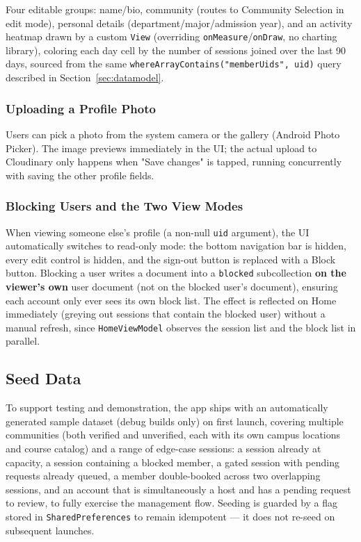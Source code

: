 Four editable groups: name/bio, community (routes to Community Selection in edit mode), personal details (department/major/admission year), and an activity heatmap drawn by a custom \texttt{View} (overriding \texttt{onMeasure}/\texttt{onDraw}, no charting library), coloring each day cell by the number of sessions joined over the last 90 days, sourced from the same \texttt{whereArrayContains("memberUids", uid)} query described in Section~\ref{sec:datamodel}.

\subsubsection{Uploading a Profile Photo}

Users can pick a photo from the system camera or the gallery (Android Photo Picker). The image previews immediately in the UI; the actual upload to Cloudinary only happens when "Save changes" is tapped, running concurrently with saving the other profile fields.

\subsubsection{Blocking Users and the Two View Modes}

When viewing someone else's profile (a non-null \texttt{uid} argument), the UI automatically switches to read-only mode: the bottom navigation bar is hidden, every edit control is hidden, and the sign-out button is replaced with a Block button. Blocking a user writes a document into a \texttt{blocked} subcollection \textbf{on the viewer's own} user document (not on the blocked user's document), ensuring each account only ever sees its own block list. The effect is reflected on Home immediately (greying out sessions that contain the blocked user) without a manual refresh, since \texttt{HomeViewModel} observes the session list and the block list in parallel.

\subsection{Seed Data}

To support testing and demonstration, the app ships with an automatically generated sample dataset (debug builds only) on first launch, covering multiple communities (both verified and unverified, each with its own campus locations and course catalog) and a range of edge-case sessions: a session already at capacity, a session containing a blocked member, a gated session with pending requests already queued, a member double-booked across two overlapping sessions, and an account that is simultaneously a host and has a pending request to review, to fully exercise the management flow. Seeding is guarded by a flag stored in \texttt{SharedPreferences} to remain idempotent — it does not re-seed on subsequent launches.
